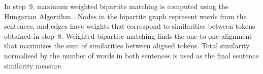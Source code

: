 In step~9, 
maximum weighted bipartite matching is computed using the Hungarian Algorithm \citep{Kuhn1955}. 
Nodes in the bipartite graph represent words from the sentences, 
and edges have weights that correspond to similarities between tokens obtained in step~8.
Weighted bipartite matching finds the one-to-one alignment that maximizes 
the sum of similarities between aligned tokens. 
Total similarity normalised by the number of words in both sentences 
is used as the final sentence similarity measure.